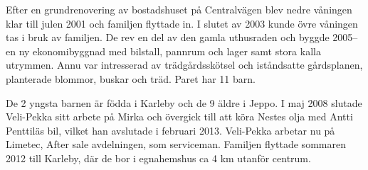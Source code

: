 Efter en grundrenovering av bostadshuset på Centralvägen	blev nedre våningen klar till julen 2001 och familjen flyttade in. I slutet av 2003 kunde övre våningen tas i bruk av familjen.  De rev en del av den gamla uthusraden och byggde 2005-- en ny ekonomibyggnad med 	bilstall, pannrum och lager samt stora kalla utrymmen. Annu var intresserad av trädgårdsskötsel och iståndsatte gårdsplanen, planterade	blommor, buskar och träd. Paret har 11 barn.
\begin{jhchildren}
  \item {}
  \item {}
  \item {}
  \item {}
  \item {}
  \item {}
  \item {}
  \item {}
  \item {}
  \item {}
  \item {}
\end{jhchildren}
De 2 yngsta barnen är födda i Karleby och de 9 äldre i Jeppo. I maj 2008 slutade Veli-Pekka sitt arbete på Mirka och övergick till att köra Nestes olja med Antti Penttiläs bil, vilket han avslutade i februari 2013. Veli-Pekka arbetar nu på Limetec, After sale avdelningen, som serviceman. Familjen flyttade sommaren 2012 till Karleby, där de bor i 	egnahemshus ca 4 km utanför centrum.


%
\jhvspace{}


